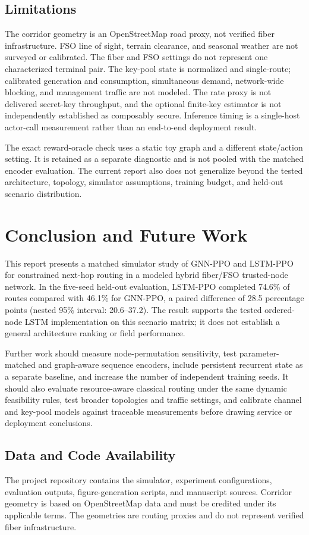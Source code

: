 \documentclass[12pt,a4paper,oneside]{report}
\begin{document}
\section{Limitations}
The corridor geometry is an OpenStreetMap road proxy, not verified fiber infrastructure. FSO line of sight, terrain clearance, and seasonal weather are not surveyed or calibrated. The fiber and FSO settings do not represent one characterized terminal pair. The key-pool state is normalized and single-route; calibrated generation and consumption, simultaneous demand, network-wide blocking, and management traffic are not modeled. The rate proxy is not delivered secret-key throughput, and the optional finite-key estimator is not independently established as composably secure. Inference timing is a single-host actor-call measurement rather than an end-to-end deployment result.

The exact reward-oracle check uses a static toy graph and a different state/action setting. It is retained as a separate diagnostic and is not pooled with the matched encoder evaluation. The current report also does not generalize beyond the tested architecture, topology, simulator assumptions, training budget, and held-out scenario distribution.

\chapter{Conclusion and Future Work}
This report presents a matched simulator study of GNN-PPO and LSTM-PPO for constrained next-hop routing in a modeled hybrid fiber/FSO trusted-node network. In the five-seed held-out evaluation, LSTM-PPO completed 74.6\% of routes compared with 46.1\% for GNN-PPO, a paired difference of 28.5 percentage points (nested 95\% interval: 20.6--37.2). The result supports the tested ordered-node LSTM implementation on this scenario matrix; it does not establish a general architecture ranking or field performance.

Further work should measure node-permutation sensitivity, test parameter-matched and graph-aware sequence encoders, include persistent recurrent state as a separate baseline, and increase the number of independent training seeds. It should also evaluate resource-aware classical routing under the same dynamic feasibility rules, test broader topologies and traffic settings, and calibrate channel and key-pool models against traceable measurements before drawing service or deployment conclusions.

\section*{Data and Code Availability}
The project repository contains the simulator, experiment configurations, evaluation outputs, figure-generation scripts, and manuscript sources. Corridor geometry is based on OpenStreetMap data and must be credited under its applicable terms. The geometries are routing proxies and do not represent verified fiber infrastructure.
\end{document}
